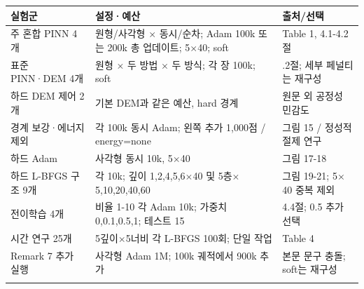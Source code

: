 \documentclass[10pt,a4paper]{article}
\begin{document}
\par\begin{minipage}{\linewidth}\begin{tabular}{>{\raggedright\arraybackslash}p{}>{\raggedright\arraybackslash}p{}>{\raggedright\arraybackslash}p{}}

\rowcolor{tint} \textbf{실험군} & \textbf{설정·예산} & \textbf{출처/선택}\\\midrule

주 혼합 PINN 4개 & 원형/사각형 $\times$ 동시/순차; Adam 100k 또는 200k 총 업데이트; 5$\times$40; soft & Table 1, 4.1-4.2절\\\addlinespace[2pt]

표준 PINN·DEM 4개 & 원형 $\times$ 두 방법 $\times$ 두 방식; 각 장 100k; soft & 4.1.2절; 세부 페널티는 재구성\\\addlinespace[2pt]

하드 DEM 제어 2개 & 기본 DEM과 같은 예산, hard 경계 & 원문 외 공정성 민감도\\\addlinespace[2pt]

경계 보강·에너지 제외 & 각 100k 동시 Adam; 왼쪽 추가 1,000점 / energy=none & 그림 15 / 정성적 절제 연구\\\addlinespace[2pt]

하드 Adam & 사각형 동시 10k, 5$\times$40 & 그림 17-18\\\addlinespace[2pt]

하드 L-BFGS 구조 9개 & 각 10k; 깊이 1,2,4,5,6$\times$40 및 5층$\times$5,10,20,40,60 & 그림 19-21; 5$\times$40 중복 제외\\\addlinespace[2pt]

전이학습 4개 & 비율 1-10 각 Adam 10k; 가중치 0,0.1,0.5,1; 테스트 15 & 4.4절; 0.5 추가 선택\\\addlinespace[2pt]

시간 연구 25개 & 5깊이$\times$5너비 각 L-BFGS 100회; 단일 작업 & Table 4\\\addlinespace[2pt]

Remark 7 추가 실행 & 사각형 Adam 1M; 100k 궤적에서 900k 추가 & 본문 문구 충돌; soft는 재구성\\\addlinespace[2pt]

\bottomrule\end{tabular}\end{minipage}\par\vspace{5pt}\endgroup
\end{document}
